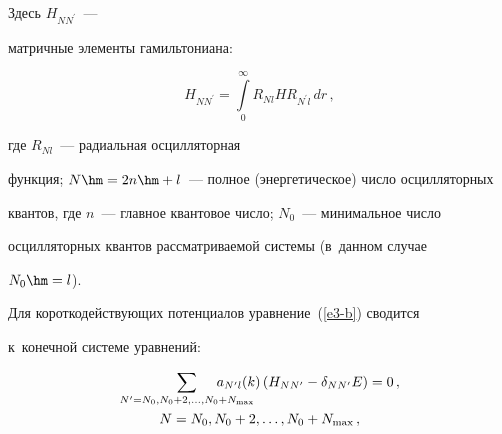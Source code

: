 Здесь $H_{NN^\prime}$~--- 


мат\-рич\-ные элементы гамильтониана:


$$


H_{NN^\prime} = \int\limits_0^\infty R_{Nl} HR_{N^\prime l}\, dr\,,


$$ 





  \vspace*{-3pt}


  


  \noindent


где $R_{Nl}$~--- радиальная осцилляторная 


функция; $N\hm= 2n\hm+l$~--- пол\-ное (энергетическое) чис\-ло осцилляторных 


кван\-тов, где $n$~--- глав\-ное кван\-то\-вое чис\-ло; $N_0$~--- минимальное чис\-ло 


осцилляторных кван\-тов рас\-смат\-ри\-ва\-емой сис\-те\-мы (в~данном случае  


$N_0\hm=l$).





  


  Для короткодействующих потенциалов уравнение~(\ref{e3-b}) сводится 


к~конечной сис\-те\-ме уравнений:





\vspace*{-8pt}





\noindent


  \begin{multline}


  \sum\limits_{N^\prime =N_0, N_0+2, \ldots , N_0+N_{\max}} \hspace*{-10mm} a_{N^\prime l}(k) 


\left( H_{NN^\prime} -\delta_{NN^\prime} E\right)=0\,,\\ 


  N=N_0, N_0+2, \ldots , N_0+N_{\max}\,,


  \label{e4-b}


  \end{multline}


  


  \vspace*{-6pt}


